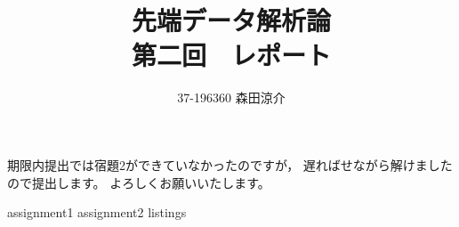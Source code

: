 \documentclass[dvipdfmx, fleqn, titlepage]{jsarticle}
\title{
	先端データ解析論 \\
	第二回　レポート
	}
\author{37-196360 \quad 森田涼介}
\begin{document}
\maketitle

期限内提出では宿題2ができていなかったのですが，
遅ればせながら解けましたので提出します。
よろしくお願いいたします。

{assignment1}
{assignment2}
\newpage
{listings}
\end{document}
